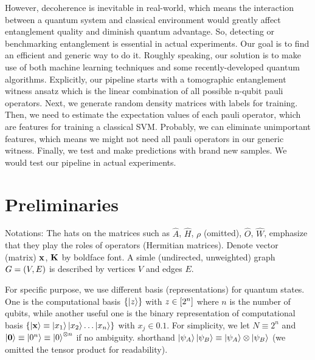 \documentclass[
aps,
pra,
floatfix,
]{revtex4-2}
\theoremstyle{plain}
\theoremstyle{definition}
\newcommand{\ew}{\hat{W}}
\newcommand{\ob}{\hat{O}}
\newcommand{\hamiltonian}{\hat{H}}
\newcommand{\dm}{\rho}
\begin{document}
However, decoherence is inevitable in real-world, which means the interaction between a quantum system and classical environment would greatly affect entanglement quality and diminish quantum advantage. So, detecting or benchmarking entanglement is essential in actual experiments. Our goal is to find an efficient and generic way to do it. Roughly speaking, our solution is to make use of both machine learning techniques and some recently-developed quantum algorithms.
Explicitly, our pipeline starts with a tomographic entanglement witness ansatz which is the linear combination of all possible n-qubit pauli operators. Next, we generate random density matrices with labels for training. Then, we need to estimate the expectation values of each pauli operator, which are features for training a classical SVM. Probably, we can eliminate unimportant features, which means we might not need all pauli operators in our generic witness. Finally, we test and make predictions with brand new samples. We would test our pipeline in actual experiments. 

\section{Preliminaries}

Notations: 
The hats on the matrices such as $\hat{A}$, $\hamiltonian$, $\dm$ (omitted), $\ob$, $\ew$, emphasize that they play the roles of operators (Hermitian matrices).
Denote vector (matrix) $\vb{x}$, $\vb{K}$ by boldface font.
A simle (undirected, unweighted) graph $G=(V,E)$ is described by vertices $V$ and edges $E$.

For specific purpose, we use different basis (representations) for quantum states.
One is the computational basis $\qty{\ket{z}}$ with $z\in \qty[2^n]$ where $n$ is the number of qubits,
while another useful one is the binary representation of computational basis $\qty{\ket{\vb{x}}\equiv\ket{x_1}\ket{x_2}\dots\ket{x_n}}$ with $x_j\in \qty{0,1}$. 
For simplicity, we let $N \equiv 2^n$ and $\ket{\vb{0}}\equiv\ket{0^n} \equiv\ket{0}^{\otimes n}$ if no ambiguity.
shorthand $\ket{\psi_A}\ket{\psi_B}\equiv \ket{\psi_A}\otimes \ket{\psi_B}$ (we omitted the tensor product for readability).
\end{document}
